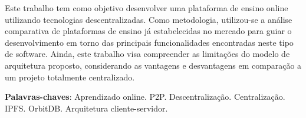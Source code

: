 \begin{resumo}
Este trabalho tem como objetivo desenvolver uma plataforma de ensino online utilizando tecnologias descentralizadas. Como metodologia, utilizou-se a análise comparativa de plataformas de ensino já estabelecidas no mercado para guiar o desenvolvimento em torno das principais funcionalidades encontradas neste tipo de software. Ainda, este trabalho visa compreender as limitações do modelo de arquitetura proposto, considerando as vantagens e desvantagens em comparação a um projeto totalmente centralizado.

 \vspace{\onelineskip}
    
 \noindent
 \textbf{Palavras-chaves}: Aprendizado online. P2P. Descentralização. Centralização. IPFS. OrbitDB. Arquitetura cliente-servidor. 
\end{resumo}
